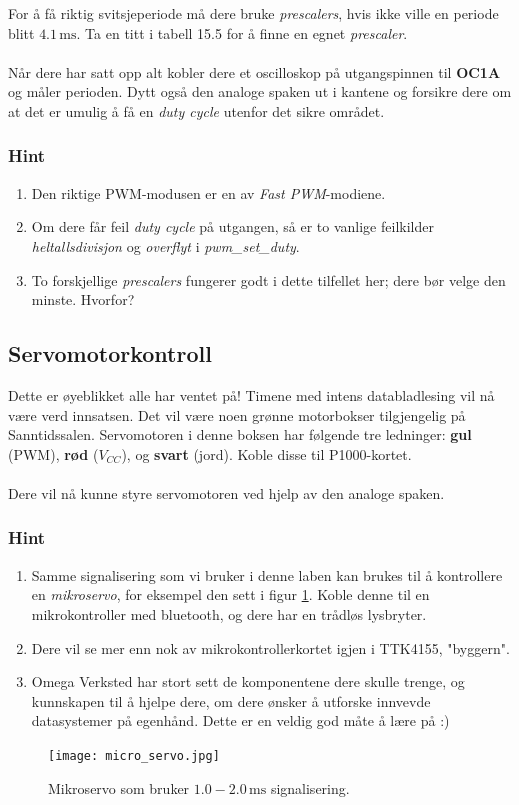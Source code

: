 \documentclass[11pt,a4paper]{article}
\begin{document}
For å få riktig svitsjeperiode må dere bruke \textit{prescalers}, hvis ikke ville en periode blitt $4.1\,\mathrm{ms}$. Ta en titt i tabell 15.5 for å finne en egnet \textit{prescaler}.\\
\\
Når dere har satt opp alt kobler dere et oscilloskop på utgangspinnen til \textbf{OC1A} og måler perioden. Dytt også den analoge spaken ut i kantene og forsikre dere om at det er umulig å få en \textit{duty cycle} utenfor det sikre området.
\subsubsection{Hint}
\begin{enumerate}
\item Den riktige PWM-modusen er en av \textit{Fast PWM}-modiene.
\item Om dere får feil \textit{duty cycle} på utgangen, så er to vanlige feilkilder \textit{heltallsdivisjon} og \textit{overflyt} i \textit{pwm\_set\_duty}.
\item To forskjellige \textit{prescalers} fungerer godt i dette tilfellet her; dere bør velge den minste. Hvorfor?
\end{enumerate}
\subsection{Servomotorkontroll}
Dette er øyeblikket alle har ventet på! Timene med intens databladlesing vil nå være verd innsatsen. Det vil være noen grønne motorbokser tilgjengelig på Sanntidssalen. Servomotoren i denne boksen har følgende tre ledninger: \textbf{gul} (PWM), \textbf{rød} ($V_{CC}$), og \textbf{svart} (jord). Koble disse til P1000-kortet.\\
\\
Dere vil nå kunne styre servomotoren ved hjelp av den analoge spaken.
\subsubsection{Hint}
\begin{enumerate}
\item Samme signalisering som vi bruker i denne laben kan brukes til å kontrollere en \textit{mikroservo}, for eksempel den sett i figur \ref{Micro::servo}. Koble denne til en mikrokontroller med bluetooth, og dere har en trådløs lysbryter.
\item Dere vil se mer enn nok av mikrokontrollerkortet igjen i TTK4155, "byggern".
\item Omega Verksted har stort sett de komponentene dere skulle trenge, og kunnskapen til å hjelpe dere, om dere ønsker å utforske innvevde datasystemer på egenhånd. Dette er en veldig god måte å lære på :)
\end{enumerate}
\begin{figure}[bh]
\centering
\texttt{[image: micro\_servo.jpg]}
\caption{Mikroservo som bruker $1.0 - 2.0\,\mathrm{ms}$ signalisering.}
\label{Micro::servo}
\end{figure}
\end{document}
